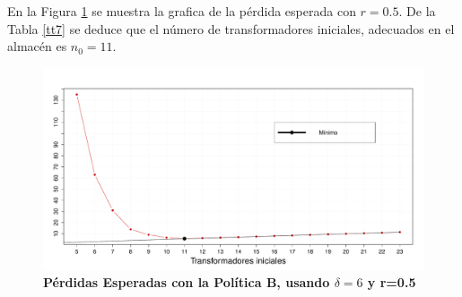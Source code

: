 
%	
%
\newpage
\noindent En la Figura \ref{r0.5delta6} se muestra la grafica de la p\'erdida esperada con $r=0.5$. De la Tabla \ref{tt7} se deduce que  el n\'umero de transformadores iniciales, adecuados en el almac\'en es $n_0=11$.
\begin{figure}[h!]
\begin{center}
\includegraphics[scale=0.3]{utipeso05delta6.pdf}
\end{center}
\vspace{-1 cm} \caption{\bf P\'erdidas Esperadas con la Pol\'itica B, usando $\delta=6$ y r=0.5}\label{r0.5delta6}
\end{figure}


